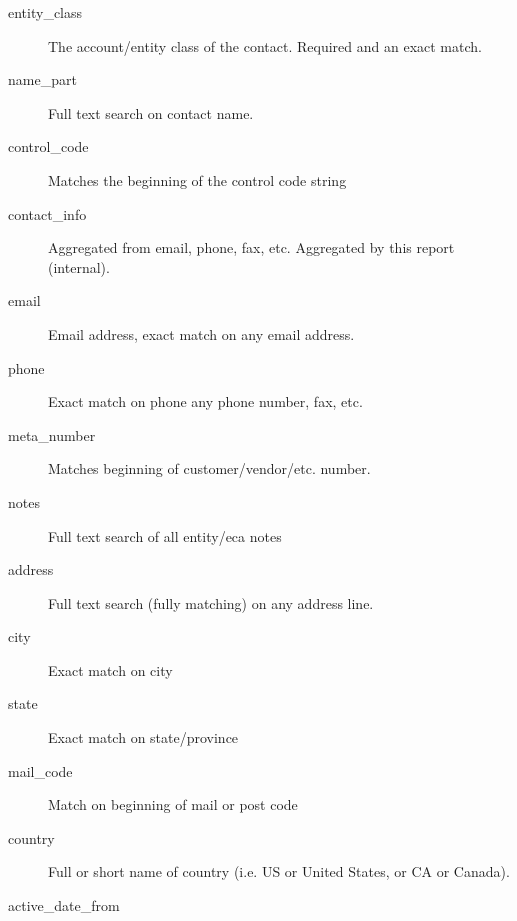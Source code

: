 \begin{description}
\begin{description}
\begin{description}
\begin{description}
\begin{description}
\begin{description}
\begin{description}
\begin{description}
\begin{description}
\begin{description}
\begin{description}
\item[{entity\_class}] \mbox{}

The account/entity class of the contact.  Required and an exact match.


\item[{name\_part}] \mbox{}

Full text search on contact name.


\item[{control\_code}] \mbox{}

Matches the beginning of the control code string


\item[{contact\_info}] \mbox{}

Aggregated from email, phone, fax, etc.  Aggregated by this report (internal).


\item[{email}] \mbox{}

Email address, exact match on any email address.


\item[{phone}] \mbox{}

Exact match on phone any phone number, fax, etc.


\item[{meta\_number}] \mbox{}

Matches beginning of customer/vendor/etc. number.


\item[{notes}] \mbox{}

Full text search of all entity/eca notes


\item[{address}] \mbox{}

Full text search (fully matching) on any address line.


\item[{city}] \mbox{}

Exact match on city


\item[{state}] \mbox{}

Exact match on state/province


\item[{mail\_code}] \mbox{}

Match on beginning of mail or post code


\item[{country}] \mbox{}

Full or short name of country (i.e. US or United States, or CA or Canada).


\item[{active\_date\_from}] \mbox{}


\end{description}
\end{description}
\end{description}
\end{description}
\end{description}
\end{description}
\end{description}
\end{description}
\end{description}
\end{description}
\end{description}
